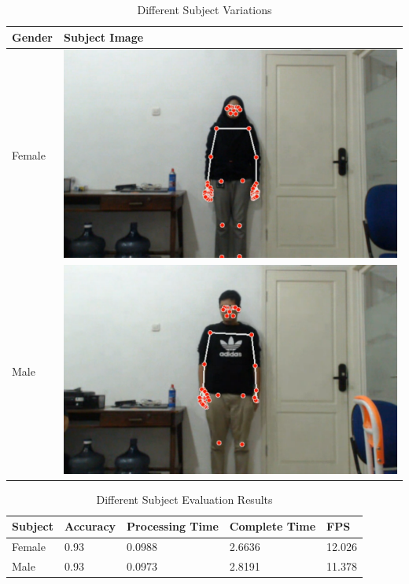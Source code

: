 \begin{table}[H]
  \caption{Different Subject Variations}
  \label{tb:subjectconditions}
  \centering
  \begin{tabular}{ll}
    \hline
    \textbf{Gender} & \textbf{Subject Image} \\
    \hline
    Female & \includegraphics[scale=0.14]{gambar/bab4-rani.png} \\
    \hline
    Male & \includegraphics[scale=0.14]{gambar/bab4-evan.png} \\
    \hline
  \end{tabular}
\end{table}

\begin{table}[H]
  \caption{Different Subject Evaluation Results}
  \label{tb:subjectevaluation}
  \centering
  \begin{tabular}{lllll}
    \hline
    \textbf{Subject} & \textbf{Accuracy} & \textbf{Processing Time} & \textbf{Complete Time} & \textbf{FPS}\\
    \hline
    Female & 0.93 & 0.0988 & 2.6636 & 12.026\\
    Male & 0.93 & 0.0973 & 2.8191   & 11.378\\
    \hline
  \end{tabular}
\end{table}

